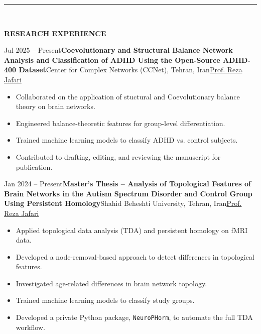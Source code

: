\documentclass[12pt, b4paper]{cv}
\begin{document}
\vspace{-0.15in}
\rule{\textwidth}{1pt}\\
\vspace{-0.15in}

{\Large \textbf{RESEARCH EXPERIENCE}}
\vspace{0.1in}

\begin{research_exp}{Jul 2025 -- Present}{\textbf{Coevolutionary and Structural Balance Network Analysis and Classification of ADHD Using the Open-Source ADHD-400 Dataset}\vspace{5pt}}{Center for Complex Networks (CCNet), Tehran, Iran}{\href{https://complexity.sbu.ac.ir/professor-reza-jafari/}{Prof. Reza Jafari}}

\vspace{10pt}
\begin{itemize}
    \item Collaborated on the application of stuctural and Coevolutionary balance theory on brain networks.

    \item Engineered balance-theoretic features for group-level differentiation.

    \item Trained machine learning models to classify ADHD vs. control subjects.

    \item Contributed to drafting, editing, and reviewing the manuscript for publication.
\end{itemize}
\end{research_exp}


\begin{research_exp}{Jan 2024 -- Present}{\textbf{Master’s Thesis – Analysis of Topological Features of Brain Networks in the Autism Spectrum Disorder and Control Group Using Persistent Homology}\vspace{5pt}}{Shahid Beheshti University, Tehran, Iran}{\href{https://complexity.sbu.ac.ir/professor-reza-jafari/}{Prof. Reza Jafari}}

\vspace{10pt}
\begin{itemize}
	
	\item Applied topological data analysis (TDA) and persistent homology on fMRI data.

	\item Developed a node-removal-based approach to detect differences in topological features.
	
	\item Investigated age-related differences in brain network topology.

	\item Trained machine learning models to classify study groups.

	\item Developed a private Python package, \texttt{NeuroPHorm}, to automate the full TDA workflow.
\end{itemize}
\end{research_exp}
\end{document}
